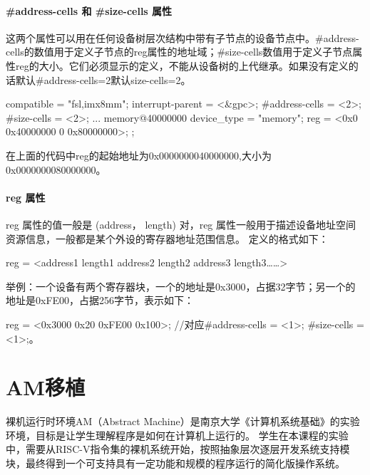 \paragraph{\#address-cells 和 \#size-cells 属性}\label{sec:13-operating-system-020}

这两个属性可以用在任何设备树层次结构中带有子节点的设备节点中。\#address-cells的数值用于定义子节点的reg属性的地址域；\#size-cells数值用于定义子节点属性reg的大小。它们必须显示的定义，不能从设备树的上代继承。如果没有定义的话默认\#address-cells=2默认size-cells=2。

\begin{CodeBlock}[language=BookDTS]
    compatible = "fsl,imx8mm";
    interrupt-parent = <&gpc>;
    #address-cells = <2>;
    #size-cells = <2>;
    ...
    memory@40000000 {
        device_type = "memory";
        reg = <0x0 0x40000000 0 0x80000000>;
    };
\end{CodeBlock}

在上面的代码中reg的起始地址为0x0000000040000000,大小为0x0000000080000000。

\paragraph{reg 属性}\label{sec:13-operating-system-021}

reg 属性的值一般是 (address， length) 对，reg 属性一般用于描述设备地址空间资源信息，一般都是某个外设的寄存器地址范围信息。
定义的格式如下：

\begin{CodeBlock}[language=BookDTS]
reg = <address1 length1 address2 length2 address3 length3……>
\end{CodeBlock}

举例：一个设备有两个寄存器块，一个的地址是0x3000，占据32字节；另一个的地址是0xFE00，占据256字节，表示如下：

\begin{CodeBlock}[language=BookDTS]
reg = <0x3000 0x20 0xFE00 0x100>;   //对应#address-cells = <1>; #size-cells = <1>;。
\end{CodeBlock}

\section{AM移植}\label{sec:13-operating-system-022}

裸机运行时环境AM（Abstract Machine）是南京大学《计算机系统基础》的实验环境，目标是让学生理解程序是如何在计算机上运行的。
学生在本课程的实验中，需要从RISC-V指令集的裸机系统开始，按照抽象层次逐层开发系统支持模块，最终得到一个可支持具有一定功能和规模的程序运行的简化版操作系统。

